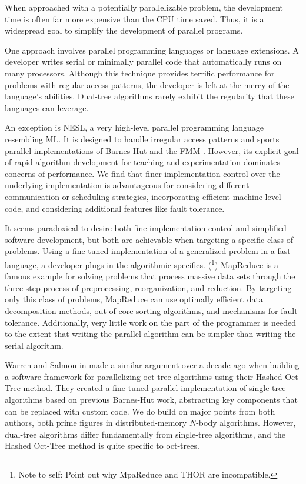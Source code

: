 \documentclass[twoside,leqno,twocolumn]{article}
\newcommand{\authornote}[1]{(\footnote{Note to self: #1})}
\newcommand{\authorsnote}[1]{\authornote{#1}}
\begin{document}
When approached with a potentially parallelizable problem, the development time is often far more expensive than the CPU time saved.
Thus, it is a widespread goal to simplify the development of parallel programs.

One approach involves parallel programming languages or language extensions.
A developer writes serial or minimally parallel code that automatically runs on many processors.
Although this technique provides terrific performance for problems with regular access patterns, the developer is left at the mercy of the language's abilities.
Dual-tree algorithms rarely exhibit the regularity that these languages can leverage.

An exception is NESL, a very high-level parallel programming language resembling ML.
It is designed to handle irregular access patterns and sports parallel implementations of Barnes-Hut and the FMM \cite{blelloch_nbody}.
However, its explicit goal of rapid algorithm development for teaching and experimentation dominates concerns of performance.
We find that finer implementation control over the underlying implementation is advantageous for considering different communication or scheduling strategies, incorporating efficient machine-level code, and considering additional features like fault tolerance.

It seems paradoxical to desire both fine implementation control and simplified software development, but both are achievable when targeting a specific class of problems.
Using a fine-tuned implementation of a generalized problem in a fast language, a developer plugs in the algorithmic specifics.
\authorsnote{Point out why MpaReduce and THOR are incompatible.}
MapReduce \cite{mapreduce} is a famous example for solving problems that process massive data sets through the three-step process of preprocessing, reorganization, and reduction.
By targeting only this class of problems, MapReduce can use optimally efficient data decomposition methods, out-of-core sorting algorithms, and mechanisms for fault-tolerance.
Additionally, very little work on the part of the programmer is needed to the extent that writing the parallel algorithm can be simpler than writing the serial algorithm.

Warren and Salmon in \cite{warren95portable} made a similar argument over a decade ago when building a software framework for parallelizing oct-tree algorithms using their Hashed Oct-Tree method.
They created a fine-tuned parallel implementation of single-tree algorithms based on previous Barnes-Hut work, abstracting key components that can be replaced with custom code.
We do build on major points from both authors, both prime figures in distributed-memory $N$-body algorithms.
However, dual-tree algorithms differ fundamentally from single-tree algorithms, and the Hashed Oct-Tree method is quite specific to oct-trees.
\end{document}
